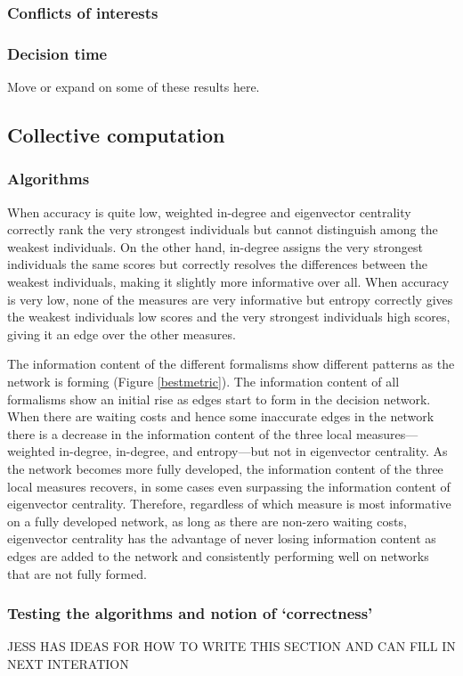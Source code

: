 \documentclass{pnastwo}
\begin{document}
\begin{article}
\subsubsection{Conflicts of interests}

\subsubsection{Decision time}
Move or expand on some of these results here. 

\subsection{Collective computation}
\subsubsection{Algorithms}
When accuracy is quite low, weighted in-degree and eigenvector centrality correctly rank the very strongest individuals but cannot distinguish among the weakest individuals. On the other hand, in-degree assigns the very strongest individuals the same scores but correctly resolves the differences between the weakest individuals, making it slightly more informative over all. When accuracy is very low, none of the measures are very informative but entropy correctly gives the weakest individuals low scores and the very strongest individuals high scores, giving it an edge over the other measures.

The information content of the different formalisms show different patterns as the network is forming (Figure \ref{bestmetric}). The information content of all formalisms show an initial rise as edges start to form in the decision network. When there are waiting costs and hence some inaccurate edges in the network there is a decrease in the information content of the three local measures---weighted in-degree, in-degree, and entropy---but not in eigenvector centrality. As the network becomes more fully developed, the information content of the three local measures recovers, in some cases even surpassing the information content of eigenvector centrality. Therefore, regardless of which measure is most informative on a fully developed network, as long as there are non-zero waiting costs, eigenvector centrality has the advantage of never losing information content as edges are added to the network and consistently performing well on networks that are not fully formed. 

\subsubsection{Testing the algorithms and notion of `correctness' }
JESS HAS IDEAS FOR HOW TO WRITE THIS SECTION AND CAN FILL IN NEXT INTERATION


\end{article}
\end{document}
